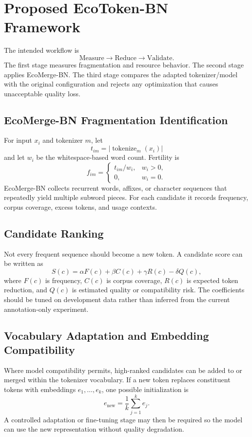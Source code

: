 \documentclass[conference]{IEEEtran}
\begin{document}
\section{Proposed EcoToken-BN Framework}
The intended workflow is
\begin{equation}
\text{Measure}\rightarrow\text{Reduce}\rightarrow\text{Validate}.
\end{equation}
The first stage measures fragmentation and resource behavior. The second stage applies EcoMerge-BN. The third stage compares the adapted tokenizer/model with the original configuration and rejects any optimization that causes unacceptable quality loss.

\subsection{EcoMerge-BN Fragmentation Identification}
For input $x_i$ and tokenizer $m$, let
\begin{equation}
t_{im}=\left|\operatorname{tokenize}_m(x_i)\right|
\end{equation}
and let $w_i$ be the whitespace-based word count. Fertility is
\begin{equation}
f_{im}=\begin{cases}t_{im}/w_i,&w_i>0,\\0,&w_i=0.\end{cases}
\end{equation}
EcoMerge-BN collects recurrent words, affixes, or character sequences that repeatedly yield multiple subword pieces. For each candidate it records frequency, corpus coverage, excess tokens, and usage contexts.

\subsection{Candidate Ranking}
Not every frequent sequence should become a new token. A candidate score can be written as
\begin{equation}
S(c)=\alpha F(c)+\beta C(c)+\gamma R(c)-\delta Q(c),
\label{eq:score}
\end{equation}
where $F(c)$ is frequency, $C(c)$ is corpus coverage, $R(c)$ is expected token reduction, and $Q(c)$ is estimated quality or compatibility risk. The coefficients should be tuned on development data rather than inferred from the current annotation-only experiment.

\subsection{Vocabulary Adaptation and Embedding Compatibility}
Where model compatibility permits, high-ranked candidates can be added to or merged within the tokenizer vocabulary. If a new token replaces constituent tokens with embeddings $e_1,\ldots,e_k$, one possible initialization is
\begin{equation}
e_{\mathrm{new}}=\frac{1}{k}\sum_{j=1}^{k}e_j.
\label{eq:embedding}
\end{equation}
A controlled adaptation or fine-tuning stage may then be required so the model can use the new representation without quality degradation.
\end{document}
